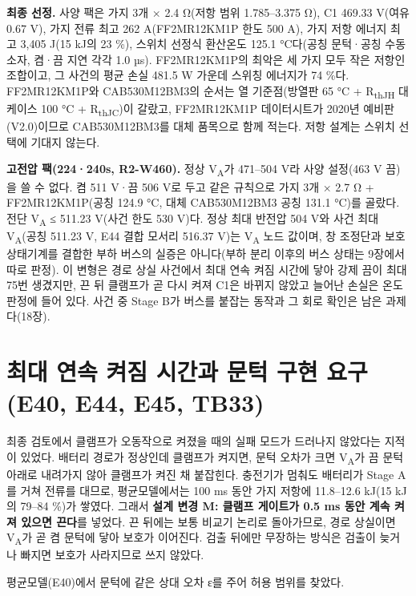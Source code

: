 \textbf{최종 선정.} 사양 팩은 가지 3개 × 2.4 Ω(저항 범위 1.785–3.375 Ω), C1 469.33 V(여유 0.67 V), 가지 전류 최고 262 A(FF2MR12KM1P 한도 500 A), 가지 저항 에너지 최고 3,405 J(15 kJ의 23 \%), 스위치 선정식 환산온도 125.1 °C다(공칭 문턱·공칭 수동소자, 켬·끔 지연 각각 1.0 µs). FF2MR12KM1P의 최악은 세 가지 모두 작은 저항인 조합이고, 그 사건의 평균 손실 481.5 W 가운데 스위칭 에너지가 74 \%다. FF2MR12KM1P와 CAB530M12BM3의 순서는 열 기준점(방열판 65 °C + R\textsubscript{thJH} 대 케이스 100 °C + R\textsubscript{thJC})이 갈랐고, FF2MR12KM1P 데이터시트가 2020년 예비판(V2.0)이므로 CAB530M12BM3를 대체 품목으로 함께 적는다. 저항 설계는 스위치 선택에 기대지 않는다.

\textbf{고전압 팩(224·240s, R2-W460).} 정상 V\textsubscript{A}가 471–504 V라 사양 설정(463 V 끔)을 쓸 수 없다. 켬 511 V·끔 506 V로 두고 같은 규칙으로 가지 3개 × 2.7 Ω + FF2MR12KM1P(공칭 124.9 °C, 대체 CAB530M12BM3 공칭 131.1 °C)를 골랐다. 전단 V\textsubscript{A} ≤ 511.23 V(사건 한도 530 V)다. 정상 최대 반전압 504 V와 사건 최대 V\textsubscript{A}(공칭 511.23 V, E44 결합 모서리 516.37 V)는 V\textsubscript{A} 노드 값이며, 창 조정단과 보호 상태기계를 결합한 부하 버스의 실증은 아니다(부하 분리 이후의 버스 상태는 9장에서 따로 판정). 이 변형은 경로 상실 사건에서 최대 연속 켜짐 시간에 닿아 강제 끔이 최대 75번 생겼지만, 끈 뒤 클램프가 곧 다시 켜져 C1은 바뀌지 않았고 늘어난 손실은 온도 판정에 들어 있다. 사건 중 Stage B가 버스를 붙잡는 동작과 그 회로 확인은 남은 과제다(18장).

\section{최대 연속 켜짐 시간과 문턱 구현 요구(E40, E44, E45, TB33)}

최종 검토에서 클램프가 오동작으로 켜졌을 때의 실패 모드가 드러나지 않았다는 지적이 있었다. 배터리 경로가 정상인데 클램프가 켜지면, 문턱 오차가 크면 V\textsubscript{A}가 끔 문턱 아래로 내려가지 않아 클램프가 켜진 채 붙잡힌다. 충전기가 멈춰도 배터리가 Stage A를 거쳐 전류를 대므로, 평균모델에서는 100 ms 동안 가지 저항에 11.8–12.6 kJ(15 kJ의 79–84 \%)가 쌓였다. 그래서 \textbf{설계 변경 M: 클램프 게이트가 0.5 ms 동안 계속 켜져 있으면 끈다}를 넣었다. 끈 뒤에는 보통 비교기 논리로 돌아가므로, 경로 상실이면 V\textsubscript{A}가 곧 켬 문턱에 닿아 보호가 이어진다. 검출 뒤에만 무장하는 방식은 검출이 늦거나 빠지면 보호가 사라지므로 쓰지 않았다.

평균모델(E40)에서 문턱에 같은 상대 오차 ε를 주어 허용 범위를 찾았다.

